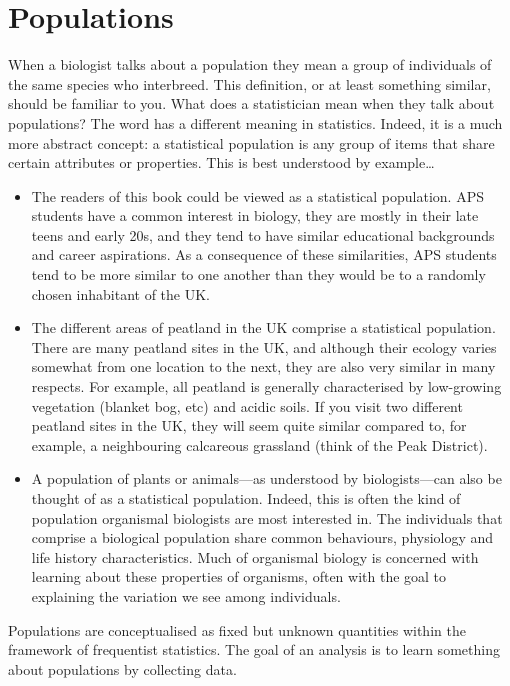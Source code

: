 \documentclass[]{book}
\begin{document}
\section{Populations}\label{populations}

When a biologist talks about a population they mean a group of
individuals of the same species who interbreed. This definition, or at
least something similar, should be familiar to you. What does a
statistician mean when they talk about populations? The word has a
different meaning in statistics. Indeed, it is a much more abstract
concept: a statistical population is any group of items that share
certain attributes or properties. This is best understood by
example\ldots{}

\begin{itemize}
\item
  The readers of this book could be viewed as a statistical population.
  APS students have a common interest in biology, they are mostly in
  their late teens and early 20s, and they tend to have similar
  educational backgrounds and career aspirations. As a consequence of
  these similarities, APS students tend to be more similar to one
  another than they would be to a randomly chosen inhabitant of the UK.
\item
  The different areas of peatland in the UK comprise a statistical
  population. There are many peatland sites in the UK, and although
  their ecology varies somewhat from one location to the next, they are
  also very similar in many respects. For example, all peatland is
  generally characterised by low-growing vegetation (blanket bog, etc)
  and acidic soils. If you visit two different peatland sites in the UK,
  they will seem quite similar compared to, for example, a neighbouring
  calcareous grassland (think of the Peak District).
\item
  A population of plants or animals---as understood by biologists---can
  also be thought of as a statistical population. Indeed, this is often
  the kind of population organismal biologists are most interested in.
  The individuals that comprise a biological population share common
  behaviours, physiology and life history characteristics. Much of
  organismal biology is concerned with learning about these properties
  of organisms, often with the goal to explaining the variation we see
  among individuals.
\end{itemize}

Populations are conceptualised as fixed but unknown quantities within
the framework of frequentist statistics. The goal of an analysis is to
learn something about populations by collecting data.
\end{document}
